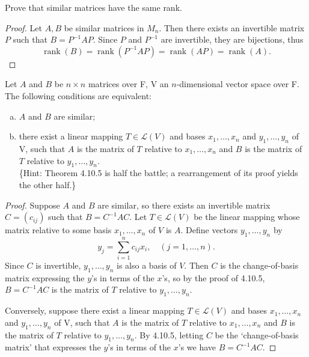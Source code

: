 \begin{tcolorbox}[title=Problem 6, breakable]
Prove that similar matrices have the same rank.
\end{tcolorbox}

\begin{proof}
    Let $A, B$ be similar matrices in $M_n$.
    Then there exists an invertible matrix $P$ such that $B = P^{-1}AP$.
    Since $P$ and $P^{-1}$ are invertible, they are bijections, thus
    \[
        \operatorname{rank}(B) = \operatorname{rank}(P^{-1}AP) = \operatorname{rank}(AP) = \operatorname{rank}(A).
    \]
\end{proof}


\begin{tcolorbox}[title=Problem 7, breakable]
Let $A$ and $B$ be $n \times n$ matrices over F, V an $n$-dimensional vector space over F. The following conditions are equivalent:
\begin{enumerate}[(a)]
    \item $A$ and $B$ are similar;
    \item there exist a linear mapping $T \in \mathcal{L}(V)$ 
    and bases $x_1, \ldots, x_n$ and $y_1, \ldots, y_n$ of V, 
    such that $A$ is the matrix of $T$ relative to $x_1, \ldots, x_n$ and $B$ 
    is the matrix of $T$ relative to $y_1, \ldots, y_n$.\\
    \{Hint: Theorem 4.10.5 is half the battle; a rearrangement of its proof yields the other half.\}
\end{enumerate}
\end{tcolorbox}

\begin{proof}
Suppose $A$ and $B$ are similar, so there exists an invertible 
    matrix $C = (c_{ij})$ such that $B = C^{-1}AC$.
    Let $T \in \mathcal{L}(V)$ be the linear mapping whose matrix relative to some 
    basis $x_1, \ldots, x_n$ of $V$ is $A$.
    Define vectors $y_1, \ldots, y_n$ by
    \[y_j = \sum_{i=1}^{n} c_{ij} x_i, \quad (j = 1, \ldots, n).\]
    Since $C$ is invertible, $y_1, \ldots, y_n$ is also a basis of $V$.
    Then $C$ is the change-of-basis matrix expressing the $y$'s in terms of the $x$'s,
    so by the proof of 4.10.5, $B = C^{-1}AC$ is the matrix of $T$ relative to 
    $y_1, \ldots, y_n$.

    Conversely, suppose there exist a linear mapping $T \in \mathcal{L}(V)$ 
    and bases $x_1, \ldots, x_n$ and $y_1, \ldots, y_n$ of V, 
    such that $A$ is the matrix of $T$ relative to $x_1, \ldots, x_n$ and $B$ 
    is the matrix of $T$ relative to $y_1, \ldots, y_n$.
    By 4.10.5, letting $C$ be the `change-of-basis matrix' that expresses the $y$'s 
    in terms of the $x$'s we have $B = C^{-1} A C$.
\end{proof}

